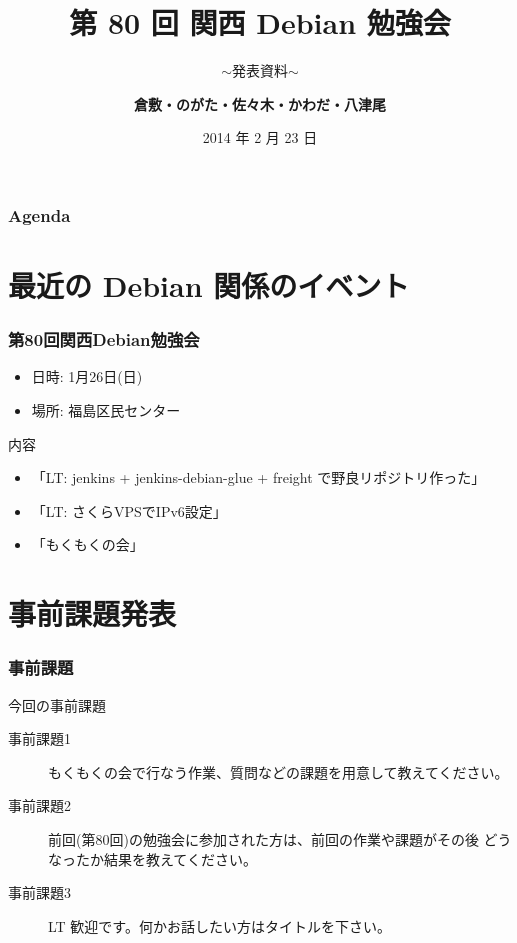 \documentclass[cjk,dvipdfmx,10pt,compress,%
hyperref={bookmarks=true,bookmarksnumbered=true,bookmarksopen=false,%
colorlinks=false,%
pdftitle={第 81 回 関西 Debian 勉強会},%
pdfauthor={倉敷・のがた・佐々木・かわだ・八津尾},%
pdfsubject={資料},%
}]{beamer}
\title{第 80 回 関西 Debian 勉強会}
\subtitle{$\sim$発表資料$\sim$}
\author[かわだ てつたろう]{{\large\bf 倉敷・のがた・佐々木・かわだ・八津尾}}
\institute[Debian JP]{{\normalsize\tt 関西 Debian 勉強会}}
\date{{\small 2014 年 2 月 23 日}}
\begin{document}
\settitleslide
\begin{frame}
\titlepage
\end{frame}
\setdefaultslide

\begin{frame}[fragile]
\frametitle{Agenda}

\tableofcontents

\end{frame}

\section{最近の Debian 関係のイベント}


\begin{frame}[fragile]
  \frametitle{第80回関西Debian勉強会}
  \begin{itemize}
  \item 日時: 1月26日(日)
  \item 場所: 福島区民センター
  \end{itemize}
  \begin{block}{内容}
    \begin{itemize}
    \item 「LT: jenkins + jenkins-debian-glue + freight で野良リポジトリ作った」
    \item 「LT: さくらVPSでIPv6設定」
    \item 「もくもくの会」
    \end{itemize}
  \end{block}
\end{frame}


\section{事前課題発表}


\begin{frame}[fragile]
  \frametitle{事前課題}
  \begin{block}{今回の事前課題}
    \begin{description}
    \item[事前課題1]
      もくもくの会で行なう作業、質問などの課題を用意して教えてください。
    \item[事前課題2]
      前回(第80回)の勉強会に参加された方は、前回の作業や課題がその後
      どうなったか結果を教えてください。
    \item[事前課題3]
      LT 歓迎です。何かお話したい方はタイトルを下さい。
    \end{description}
  \end{block}
\end{frame}
\end{document}
